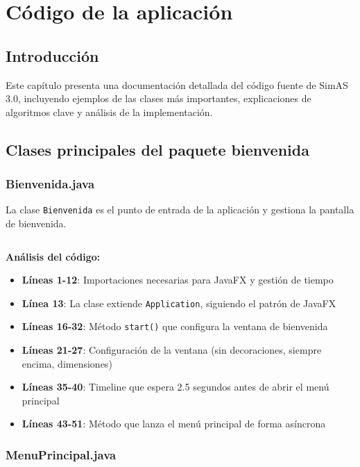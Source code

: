 \chapter{Código de la aplicación}\label{cap-documentacion-interna}

\section{Introducción}

Este capítulo presenta una documentación detallada del código fuente de SimAS 3.0, incluyendo ejemplos de las clases más importantes, explicaciones de algoritmos clave y análisis de la implementación.

\section{Clases principales del paquete bienvenida}

\subsection{Bienvenida.java}

La clase \texttt{Bienvenida} es el punto de entrada de la aplicación y gestiona la pantalla de bienvenida.

\inputminted[linenos,breaklines,firstline=1,lastline=30]{java}{codigo/src/bienvenida/Bienvenida.java}

\textbf{Análisis del código:}

\begin{itemize}
    \item \textbf{Líneas 1-12}: Importaciones necesarias para JavaFX y gestión de tiempo
    \item \textbf{Línea 13}: La clase extiende \texttt{Application}, siguiendo el patrón de JavaFX
    \item \textbf{Líneas 16-32}: Método \texttt{start()} que configura la ventana de bienvenida
    \item \textbf{Líneas 21-27}: Configuración de la ventana (sin decoraciones, siempre encima, dimensiones)
    \item \textbf{Líneas 35-40}: Timeline que espera 2.5 segundos antes de abrir el menú principal
    \item \textbf{Líneas 43-51}: Método que lanza el menú principal de forma asíncrona
\end{itemize}

\subsection{MenuPrincipal.java}

